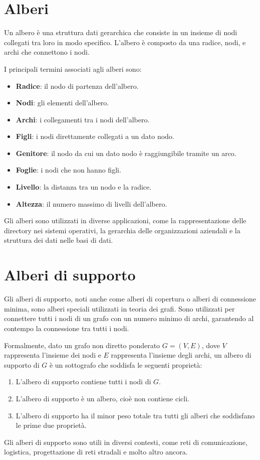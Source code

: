 \section{Alberi}


Un albero è una struttura dati gerarchica che consiste in un insieme di nodi collegati tra loro in modo specifico. L'albero è composto da una radice, nodi, e archi che connettono i nodi.

I principali termini associati agli alberi sono:

\begin{itemize}
    \item \textbf{Radice}: il nodo di partenza dell'albero.
    \item \textbf{Nodi}: gli elementi dell'albero.
    \item \textbf{Archi}: i collegamenti tra i nodi dell'albero.
    \item \textbf{Figli}: i nodi direttamente collegati a un dato nodo.
    \item \textbf{Genitore}: il nodo da cui un dato nodo è raggiungibile tramite un arco.
    \item \textbf{Foglie}: i nodi che non hanno figli.
    \item \textbf{Livello}: la distanza tra un nodo e la radice.
    \item \textbf{Altezza}: il numero massimo di livelli dell'albero.
\end{itemize}

Gli alberi sono utilizzati in diverse applicazioni, come la rappresentazione delle directory nei sistemi operativi, la gerarchia delle organizzazioni aziendali e la struttura dei dati nelle basi di dati.

\section{Alberi di supporto}
Gli alberi di supporto, noti anche come alberi di copertura o alberi di connessione minima, sono alberi speciali utilizzati in teoria dei grafi. Sono utilizzati per connettere tutti i nodi di un grafo con un numero minimo di archi, garantendo al contempo la connessione tra tutti i nodi.

Formalmente, dato un grafo non diretto ponderato $G = (V, E)$, dove $V$ rappresenta l'insieme dei nodi e $E$ rappresenta l'insieme degli archi, un albero di supporto di $G$ è un sottografo che soddisfa le seguenti proprietà:

\begin{enumerate}
    \item L'albero di supporto contiene tutti i nodi di $G$.
    \item L'albero di supporto è un albero, cioè non contiene cicli.
    \item L'albero di supporto ha il minor peso totale tra tutti gli alberi che soddisfano le prime due proprietà.
\end{enumerate}

Gli alberi di supporto sono utili in diversi contesti, come reti di comunicazione, logistica, progettazione di reti stradali e molto altro ancora.
